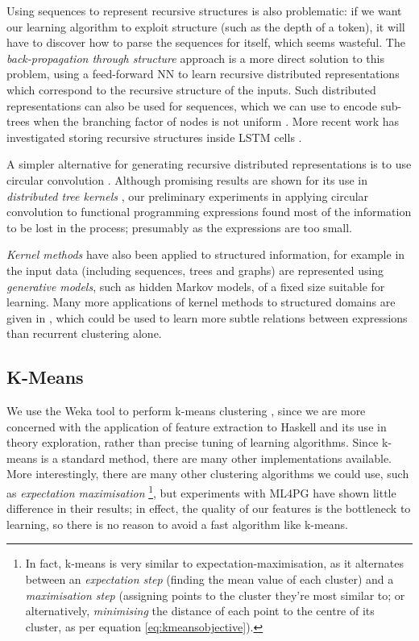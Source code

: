 Using sequences to represent recursive structures is also problematic: if we want our learning algorithm to exploit structure (such as the depth of a token), it will have to discover how to parse the sequences for itself, which seems wasteful. The \emph{back-propagation through structure} approach \cite{goller1996learning} is a more direct solution to this problem, using a feed-forward NN to learn recursive distributed representations \cite{pollack1990recursive} which correspond to the recursive structure of the inputs. Such distributed representations can also be used for sequences, which we can use to encode sub-trees when the branching factor of nodes is not  uniform \cite{kwasny1995tail}. More recent work has investigated storing recursive structures inside LSTM cells \cite{zhu2015long}.

A simpler alternative for generating recursive distributed representations is to use circular convolution \cite{conf/ijcai/Plate91}. Although promising results are shown for its use in \emph{distributed tree kernels} \cite{zanzotto2012distributed}, our preliminary experiments in applying circular convolution to functional programming expressions found most of the information to be lost in the process; presumably as the expressions are too small.

\emph{Kernel methods} have also been applied to structured information, for example in \cite{Gartner2003} the input data (including sequences, trees and graphs) are represented using \emph{generative models}, such as hidden Markov models, of a fixed size suitable for learning. Many more applications of kernel methods to structured domains are given in \cite{bakir2007predicting}, which could be used to learn more subtle relations between expressions than recurrent clustering alone.

\subsection{K-Means}

We use the Weka tool to perform k-means clustering \cite{Holmes.Donkin.Witten:1994}, since we are more concerned with the application of feature extraction to Haskell and its use in theory exploration, rather than precise tuning of learning algorithms. Since k-means is a standard method, there are many other implementations available. More interestingly, there are many other clustering algorithms we could use, such as \emph{expectation maximisation} \footnote{In fact, k-means is very similar to expectation-maximisation, as it alternates between an \emph{expectation step} (finding the mean value of each cluster) and a \emph{maximisation step} (assigning points to the cluster they're most similar to; or alternatively, \emph{minimising} the distance of each point to the centre of its cluster, as per equation \ref{eq:kmeansobjective}).}, but experiments with ML4PG have shown little difference in their results; in effect, the quality of our features is the bottleneck to learning, so there is no reason to avoid a fast algorithm like k-means.

